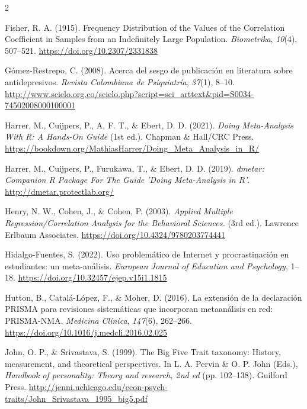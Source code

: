 \documentclass[
  bookmarksnumbered]{article}
\newlength{\cslhangindent}
\newlength{\cslentryspacingunit} %
\newenvironment{CSLReferences}[2] %
 {%
  \setlength{\parindent}{0pt}
  \ifodd #1
  \let\oldpar\par
  \def\par{\hangindent=\cslhangindent\oldpar}
  \fi
  \setlength{\parskip}{#2\cslentryspacingunit}
 }%
 {}
\begin{document}
\begin{multicols}{2}
\begin{CSLReferences}{1}{0}
\leavevmode{}%
Fisher, R. A. (1915). Frequency {Distribution} of the {Values} of the {Correlation Coefficient} in {Samples} from an {Indefinitely Large Population}. \emph{Biometrika}, \emph{10}(4), 507--521. \url{https://doi.org/10.2307/2331838}

\leavevmode{}%
Gómez-Restrepo, C. (2008). {Acerca del sesgo de publicación en literatura sobre antidepresivos}. \emph{Revista Colombiana de Psiquiatría}, \emph{37}(1), 8--10. \url{http://www.scielo.org.co/scielo.php?script=sci_arttext\&pid=S0034-74502008000100001}

\leavevmode{}%
Harrer, M., Cuijpers, P., A, F. T., \& Ebert, D. D. (2021). \emph{{Doing Meta-Analysis With {R}: A Hands-On Guide}} (1st ed.). {Chapman \& Hall/CRC Press}. \url{https://bookdown.org/MathiasHarrer/Doing_Meta_Analysis_in_R/}

\leavevmode{}%
Harrer, M., Cuijpers, P., Furukawa, T., \& Ebert, D. D. (2019). \emph{{dmetar: Companion R Package For The Guide 'Doing Meta-Analysis in R'}}. \url{http://dmetar.protectlab.org/}

\leavevmode{}%
Henry, N. W., Cohen, J., \& Cohen, P. (2003). \emph{Applied {Multiple Regression}/{Correlation Analysis} for the {Behavioral Sciences}.} (3rd ed.). {Lawrence Erlbaum Associates}. \url{https://doi.org/10.4324/9780203774441}

\leavevmode{}%
Hidalgo-Fuentes, S. (2022). {Uso problemático de Internet y procrastinación en estudiantes: un meta-análisis}. \emph{European Journal of Education and Psychology}, 1--18. \url{https://doi.org/10.32457/ejep.v15i1.1815}

\leavevmode{}%
Hutton, B., Catalá-López, F., \& Moher, D. (2016). {La extensión de la declaración PRISMA para revisiones sistemáticas que incorporan metaanálisis en red: PRISMA-NMA}. \emph{Medicina Clínica}, \emph{147}(6), 262--266. \url{https://doi.org/10.1016/j.medcli.2016.02.025}

\leavevmode{}%
John, O. P., \& Srivastava, S. (1999). The {Big Five Trait} taxonomy: {History}, measurement, and theoretical perspectives. In L. A. Pervin \& O. P. John (Eds.), \emph{Handbook of personality: {Theory} and research, 2nd ed} (pp. 102--138). {Guilford Press}. \url{http://jenni.uchicago.edu/econ-psych-traits/John_Srivastava_1995_big5.pdf}


\end{CSLReferences}
\end{multicols}
\end{document}
